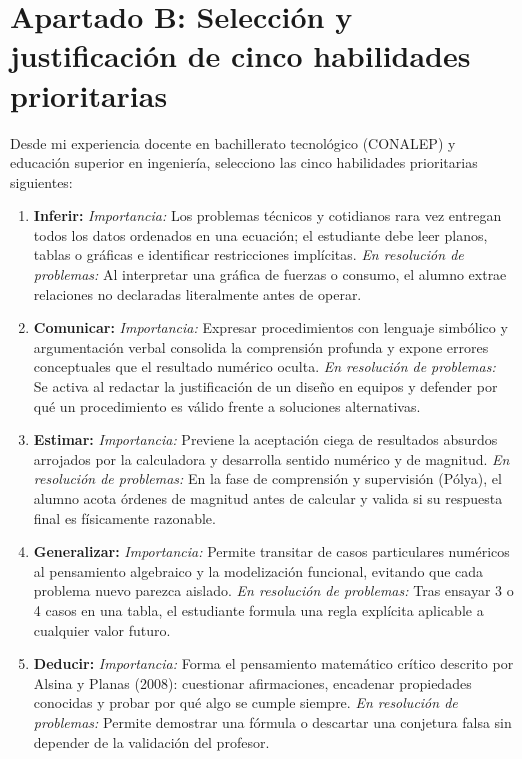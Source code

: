 \documentclass[spanish,letterpaper,oneside]{article}
\begin{document}
\section{Apartado B: Selección y justificación de cinco habilidades prioritarias}
Desde mi experiencia docente en bachillerato tecnológico (CONALEP) y educación superior en ingeniería, selecciono las cinco habilidades prioritarias siguientes:
\begin{enumerate}
  \item \textbf{Inferir:} \textit{Importancia:} Los problemas técnicos y cotidianos rara vez entregan todos los datos ordenados en una ecuación; el estudiante debe leer planos, tablas o gráficas e identificar restricciones implícitas. \textit{En resolución de problemas:} Al interpretar una gráfica de fuerzas o consumo, el alumno extrae relaciones no declaradas literalmente antes de operar.
  \item \textbf{Comunicar:} \textit{Importancia:} Expresar procedimientos con lenguaje simbólico y argumentación verbal consolida la comprensión profunda y expone errores conceptuales que el resultado numérico oculta. \textit{En resolución de problemas:} Se activa al redactar la justificación de un diseño en equipos y defender por qué un procedimiento es válido frente a soluciones alternativas.
  \item \textbf{Estimar:} \textit{Importancia:} Previene la aceptación ciega de resultados absurdos arrojados por la calculadora y desarrolla sentido numérico y de magnitud. \textit{En resolución de problemas:} En la fase de comprensión y supervisión (Pólya), el alumno acota órdenes de magnitud antes de calcular y valida si su respuesta final es físicamente razonable.
  \item \textbf{Generalizar:} \textit{Importancia:} Permite transitar de casos particulares numéricos al pensamiento algebraico y la modelización funcional, evitando que cada problema nuevo parezca aislado. \textit{En resolución de problemas:} Tras ensayar 3 o 4 casos en una tabla, el estudiante formula una regla explícita aplicable a cualquier valor futuro.
  \item \textbf{Deducir:} \textit{Importancia:} Forma el pensamiento matemático crítico descrito por Alsina y Planas (2008): cuestionar afirmaciones, encadenar propiedades conocidas y probar por qué algo se cumple siempre. \textit{En resolución de problemas:} Permite demostrar una fórmula o descartar una conjetura falsa sin depender de la validación del profesor.
\end{enumerate}
\end{document}
